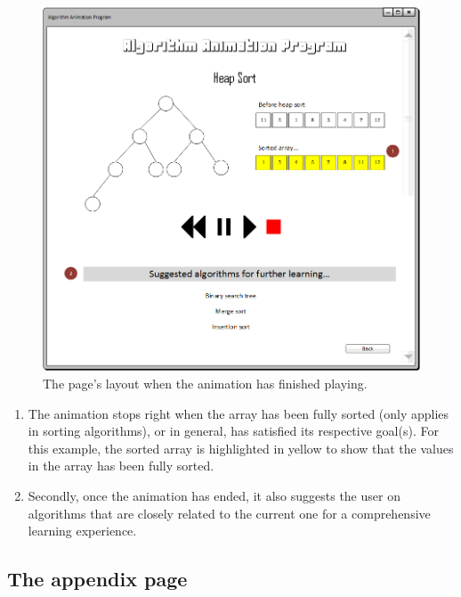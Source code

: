 \newpage

\begin{figure}[H]
\centering
\hspace*{-0.5cm}
\includegraphics[scale=0.8]{images/report_images/uiAnimationDone.png}
\caption{The page's layout when the animation has finished playing.}
\label{uiAnimationDone}
\end{figure}

\begin{enumerate}
\item The animation stops right when the array has been fully sorted (only applies in sorting algorithms), or in general, has satisfied its respective goal(s). For this example, the sorted array is highlighted in yellow to show that the values in the array has been fully sorted.
\item Secondly, once the animation has ended, it also suggests the user on algorithms that are closely related to the current one for a comprehensive learning experience.
\end{enumerate}

\subsection{The appendix page}

